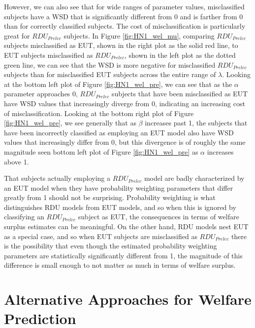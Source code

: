\documentclass[../main.tex]{subfiles}
\begin{document}
However, we can also see that for wide ranges of parameter values, misclassified subjects have a WSD that is significantly different from 0 and is farther from 0 than for correctly classified subjects.
The cost of misclassification is particularly great for $\mathit{RDU_{Prelec}}$ subjects.
In Figure \ref{fig:HN1_wel_mu}, comparing $\mathit{RDU_{Prelec}}$ subjects misclassified as EUT, shown in the right plot as the solid red line, to EUT subjects misclassified as $\mathit{RDU_{Prelec}}$, shown in the left plot as the dotted green line, we can see that the WSD is more negative for misclassified $\mathit{RDU_{Prelec}}$ subjects than for misclassified EUT subjects across the entire range of $\lambda$.
Looking at the bottom left plot of Figure \ref{fig:HN1_wel_pre}, we can see that as the $\alpha$ parameter approaches 0, $\mathit{RDU_{Prelec}}$ subjects that have been misclassified as EUT have WSD values that increasingly diverge from 0, indicating an increasing cost of misclassification.
Looking at the bottom right plot of  Figure \ref{fig:HN1_wel_pre}, we see generally that as $\beta$ increases past 1, the subjects that have been incorrectly classified as employing an EUT model also have WSD values that increasingly differ from 0, but this divergence is of roughly the same magnitude seen bottom left plot of Figure \ref{fig:HN1_wel_pre} as $\alpha$ increases above 1.

That subjects actually employing a $\mathit{RDU_{Prelec}}$ model are badly characterized by an EUT model when they have probability weighting parameters that differ greatly from 1 should not be surprising.
Probability weighting is what distinguishes RDU models from EUT models, and so when this is ignored by classifying an $\mathit{RDU_{Prelec}}$ subject as EUT, the consequences in terms of welfare surplus estimates can be meaningful.
On the other hand, RDU models nest EUT as a special case, and so when EUT subjects are misclassified as $\mathit{RDU_{Prelec}}$ there is the possibility that even though the estimated probability weighting parameters are statistically significantly different from 1, the magnitude of this difference is small enough to not matter as much in terms of welfare surplus.

\section{Alternative Approaches for Welfare Prediction}
\end{document}
